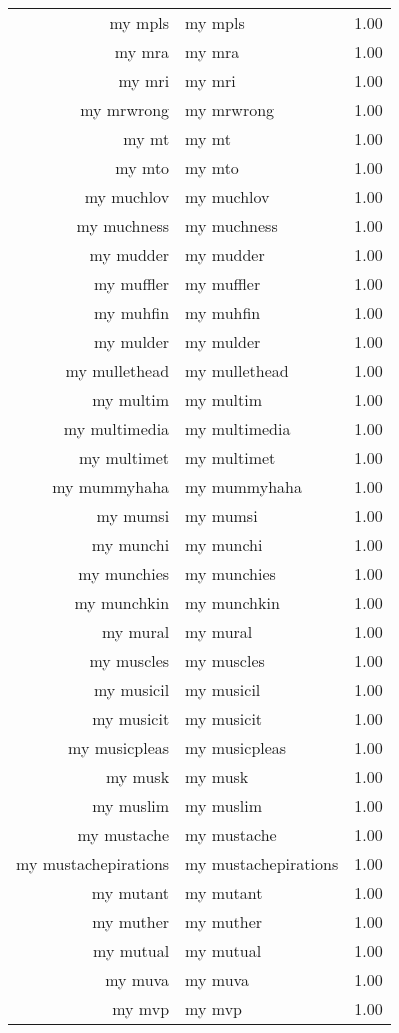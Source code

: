 \begin{table}[ht]
\begin{tabular}{rlr}
  my mpls & my mpls & 1.00 \\ 
  my mra & my mra & 1.00 \\ 
  my mri & my mri & 1.00 \\ 
  my mrwrong & my mrwrong & 1.00 \\ 
  my mt & my mt & 1.00 \\ 
  my mto & my mto & 1.00 \\ 
  my muchlov & my muchlov & 1.00 \\ 
  my muchness & my muchness & 1.00 \\ 
  my mudder & my mudder & 1.00 \\ 
  my muffler & my muffler & 1.00 \\ 
  my muhfin & my muhfin & 1.00 \\ 
  my mulder & my mulder & 1.00 \\ 
  my mullethead & my mullethead & 1.00 \\ 
  my multim & my multim & 1.00 \\ 
  my multimedia & my multimedia & 1.00 \\ 
  my multimet & my multimet & 1.00 \\ 
  my mummyhaha & my mummyhaha & 1.00 \\ 
  my mumsi & my mumsi & 1.00 \\ 
  my munchi & my munchi & 1.00 \\ 
  my munchies & my munchies & 1.00 \\ 
  my munchkin & my munchkin & 1.00 \\ 
  my mural & my mural & 1.00 \\ 
  my muscles & my muscles & 1.00 \\ 
  my musicil & my musicil & 1.00 \\ 
  my musicit & my musicit & 1.00 \\ 
  my musicpleas & my musicpleas & 1.00 \\ 
  my musk & my musk & 1.00 \\ 
  my muslim & my muslim & 1.00 \\ 
  my mustache & my mustache & 1.00 \\ 
  my mustachepirations & my mustachepirations & 1.00 \\ 
  my mutant & my mutant & 1.00 \\ 
  my muther & my muther & 1.00 \\ 
  my mutual & my mutual & 1.00 \\ 
  my muva & my muva & 1.00 \\ 
  my mvp & my mvp & 1.00 \\ 

\end{tabular}
\end{table}
